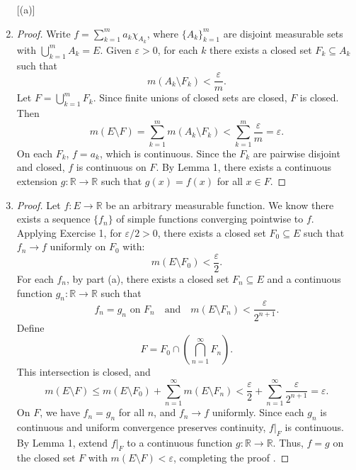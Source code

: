 \documentclass[11pt]{article}
\let\eps\varepsilon
\begin{document}
\begin{exercise}{2}
    \begin{enumerate} [(a)]
        \item \begin{proof} Write \( f = \sum_{k=1}^m a_k \chi_{A_k} \), where \( \{A_k\}_{k=1}^m \) are disjoint measurable sets with \( \bigcup_{k=1}^m A_k = E \). Given \( \eps > 0 \), for each $k$ there exists a closed set \( F_k \subseteq A_k \) such that
\[
m(A_k \setminus F_k) < \frac{\eps}{m}.
\]
Let \( F = \bigcup_{k=1}^m F_k \). Since finite unions of closed sets are closed, \( F \) is closed. Then
\[
m(E \setminus F) = \sum_{k=1}^m m(A_k \setminus F_k) < \sum_{k=1}^m \frac{\eps}{m} = \eps.
\]
On each \( F_k \), \( f = a_k \), which is continuous. Since the \( F_k \) are pairwise disjoint and closed, \( f \) is continuous on \( F \). By Lemma 1, there exists a continuous extension \( g: \mathbb{R} \to \mathbb{R} \) such that \( g(x) = f(x) \) for all \( x \in F \). \end{proof}
\item  \begin{proof} Let \( f: E \to \mathbb{R} \) be an arbitrary measurable function. We know there exists a sequence \( \{f_n\} \) of simple functions converging pointwise to \( f \). Applying Exercise 1, for \( \eps/2 > 0 \), there exists a closed set \( F_0 \subseteq E \) such that \( f_n \to f \) uniformly on \( F_0 \) with:
    \[
    m(E \setminus F_0) < \frac{\eps}{2}.
    \]
For each \( f_n \), by part (a), there exists a closed set \( F_n \subseteq E \) and a continuous function \( g_n: \mathbb{R} \to \mathbb{R} \) such that
    \[
    f_n = g_n \text{ on } F_n \quad \text{and} \quad m(E \setminus F_n) < \frac{\eps}{2^{n+1}}.
    \]
Define
    \[
    F = F_0 \cap \left( \bigcap_{n=1}^\infty F_n \right).
    \]
    This intersection is closed, and
    \[
    m(E \setminus F) \leq m(E \setminus F_0) + \sum_{n=1}^\infty m(E \setminus F_n) < \frac{\eps}{2} + \sum_{n=1}^\infty \frac{\eps}{2^{n+1}} = \eps.
    \]
    On \( F \), we have \( f_n = g_n \) for all \( n \), and \( f_n \to f \) uniformly. Since each \( g_n \) is continuous and uniform convergence preserves continuity, \( f|_F \) is continuous. By Lemma 1, extend \( f|_F \) to a continuous function \( g: \mathbb{R} \to \mathbb{R} \).
    Thus, \( f = g \) on the closed set \( F \) with \( m(E \setminus F) < \eps \), completing the proof .
\end{proof}
    \end{enumerate}
\end{exercise}
\end{document}
